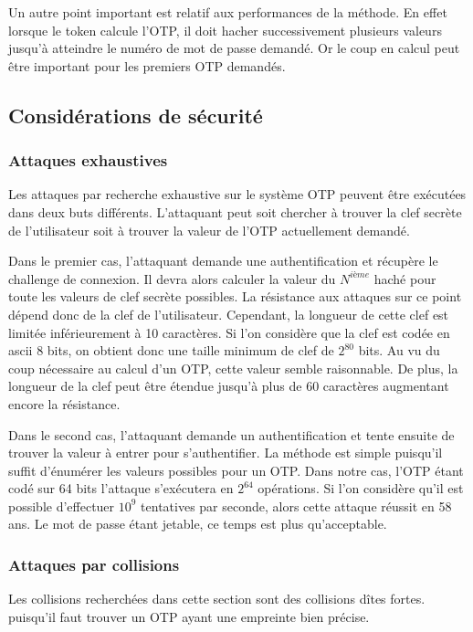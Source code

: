 \documentclass{../res/univ-projet}
\begin{document}
  Un autre point important est relatif aux performances de la méthode. En effet
  lorsque le token calcule l'OTP, il doit hacher successivement plusieurs 
  valeurs jusqu'à atteindre le numéro de mot de passe demandé. Or le coup en 
  calcul peut être important pour les premiers OTP demandés.
  
  \subsection{Considérations de sécurité}
    \subsubsection{Attaques exhaustives}
    Les attaques par recherche exhaustive sur le système OTP peuvent être 
    exécutées dans deux buts différents. L'attaquant peut soit chercher à
    trouver la clef secrète de l'utilisateur soit à trouver la valeur de l'OTP
    actuellement demandé.
    
    Dans le premier cas, l'attaquant demande une authentification et récupère 
    le challenge de connexion. Il devra alors calculer la valeur du $N^{ième}$ 
    haché pour toute les valeurs de clef secrète possibles. La résistance aux
    attaques sur ce point dépend donc de la clef de l'utilisateur. Cependant, 
    la longueur de cette clef est limitée inférieurement à 10 caractères. Si
    l'on considère que la clef est codée en ascii 8 bits, on obtient donc une 
    taille minimum de clef de $2^{80}$ bits. Au vu du coup nécessaire au 
    calcul d'un OTP, cette valeur semble raisonnable. De plus, la longueur de 
    la clef peut être étendue jusqu'à plus de 60 caractères augmentant encore
    la résistance.
    
    Dans le second cas, l'attaquant demande un authentification et tente 
    ensuite de trouver la valeur à entrer pour s'authentifier. La méthode est
    simple puisqu'il suffit d'énumérer les valeurs possibles pour un OTP. Dans
    notre cas, l'OTP étant codé sur 64 bits l'attaque s'exécutera en $2^{64}$ 
    opérations. Si l'on considère qu'il est possible d'effectuer $10^9$ 
    tentatives par seconde, alors cette attaque réussit en 58 ans. Le mot de 
    passe étant jetable, ce temps est plus qu'acceptable.
    
    \subsubsection{Attaques par collisions}
        Les collisions recherchées dans cette section sont des collisions dîtes fortes.
    puisqu'il faut trouver un OTP ayant une empreinte bien précise.
    
\end{document}
